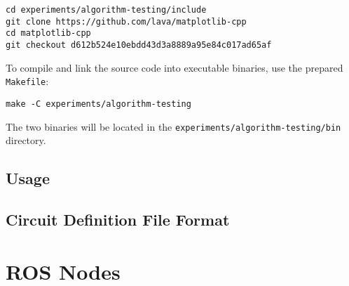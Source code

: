 \begin{lstlisting}
cd experiments/algorithm-testing/include
git clone https://github.com/lava/matplotlib-cpp
cd matplotlib-cpp
git checkout d612b524e10ebdd43d3a8889a95e84c017ad65af
\end{lstlisting}

To compile and link the source code into executable binaries, use the prepared \texttt{Makefile}:

\begin{lstlisting}
make -C experiments/algorithm-testing
\end{lstlisting}

The two binaries will be located in the \texttt{experiments/algorithm-testing/bin} directory.

\subsection{Usage}


\subsection{Circuit Definition File Format}


\section{ROS Nodes}

